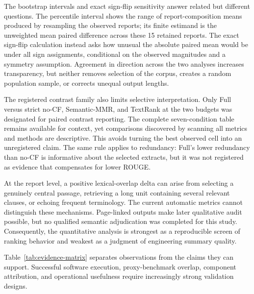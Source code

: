 \documentclass[applsci,article,submit,moreauthors]{Definitions/mdpi}
\begin{document}
The bootstrap intervals and exact sign-flip sensitivity answer related but different questions. The percentile interval shows the range of report-composition means produced by resampling the observed reports; its finite estimand is the unweighted mean paired difference across these 15 retained reports. The exact sign-flip calculation instead asks how unusual the absolute paired mean would be under all sign assignments, conditional on the observed magnitudes and a symmetry assumption. Agreement in direction across the two analyses increases transparency, but neither removes selection of the corpus, creates a random population sample, or corrects unequal output lengths.

The registered contrast family also limits selective interpretation. Only Full versus strict no-CF, Semantic-MMR, and TextRank at the two budgets was designated for paired contrast reporting. The complete seven-condition table remains available for context, yet comparisons discovered by scanning all metrics and methods are descriptive. This avoids turning the best observed cell into an unregistered claim. The same rule applies to redundancy: Full's lower redundancy than no-CF is informative about the selected extracts, but it was not registered as evidence that compensates for lower ROUGE.

At the report level, a positive lexical-overlap delta can arise from selecting a genuinely central passage, retrieving a long unit containing several relevant clauses, or echoing frequent terminology. The current automatic metrics cannot distinguish these mechanisms. Page-linked outputs make later qualitative audit possible, but no qualified semantic adjudication was completed for this study. Consequently, the quantitative analysis is strongest as a reproducible screen of ranking behavior and weakest as a judgment of engineering summary quality.

Table~\ref{tab:evidence-matrix} separates observations from the claims they can support. Successful software execution, proxy-benchmark overlap, component attribution, and operational usefulness require increasingly strong validation designs.
\end{document}
